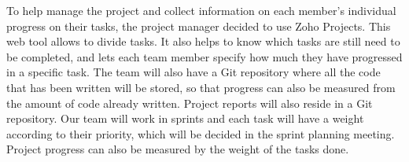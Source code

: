 
To help manage the project and collect information on each member's individual
progress on their tasks, the project manager decided to use Zoho Projects. This
web tool allows to divide tasks. It also helps to know which tasks are still
need to be completed, and lets each team member specify how much they have
progressed in a specific task. The team will also have a Git repository where
all the code that has been written will be stored, so that progress can also be
measured from the amount of code already written. Project reports will also
reside in a Git repository. Our team will work in sprints and each task will
have a weight according to their priority, which will be decided in the sprint
planning meeting. Project progress can also be measured by the weight of the
tasks done.
